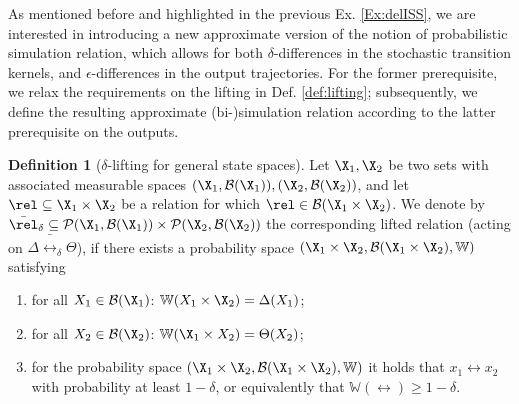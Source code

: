 \documentclass[letterpaper, 10 pt, conference]{amsart}
\theoremstyle{definition}
\newtheorem{defn}[definition]{Definition}
\theoremstyle{example}
\theoremstyle{remark}
\begin{document}
As mentioned before and highlighted in the previous Ex. \ref{Ex:delISS}, 
we are interested in introducing a new approximate  
version of the notion of probabilistic simulation relation, 
which allows for both
 $\delta$-differences in the stochastic transition kernels, and $\epsilon$-differences in the output trajectories. For the former prerequisite, 
we relax the requirements on the lifting in Def. \ref{def:lifting};  
subsequently, we define the resulting approximate (bi-)simulation relation according to the latter prerequisite on the outputs.   
\begin{defn}[$\delta$-lifting for general state spaces]\label{def:del_lifting}
Let $\X_1,\X_2$ be two sets with associated measurable spaces $(\X_1,\mathcal B(\X_1)), (\X_2,\mathcal B(\X_2))$, 
and let  $\rel\subseteq \X_1\times \X_2$ be a relation for which $\rel\in \mathcal B(\X_1\times \X_2)$. 
We denote by 
$\bar\rel_\delta\subseteq \mathcal{P}(\X_1,\mathcal B(\X_1))\times \mathcal{P}(\X_2,\mathcal B(\X_2))$ the corresponding lifted relation (acting on $\Delta \bar \rel_\delta \Theta$), 
if there exists a probability space $(\X_1\times \X_2,\mathcal B(\X_1\times \X_2), \mathbb W)$  satisfying { \setlength{\parskip}{-1pt}\setlength{\parsep}{0pt}
\begin{enumerate}
\item for all $X_1\in \mathcal{B}(\X_1)$: $\mathbb W(X_1\times \X_2)=\Delta(X_1)$; 
\item  for all $X_2\in \mathcal{B}(\X_2)$:  $\mathbb W(\X_1\times X_2)=\Theta(X_2)$; 
\item for the probability space  $(\X_1\times \X_2,\mathcal B(\X_1\times \X_2), \mathbb W)$ it holds that 
$x_1\rel x_2$ with probability at least $1-\delta$, or equivalently that $\mathbb{W}\left(\rel\right)\geq1-\delta$.  
\end{enumerate}}\end{defn}
\end{document}
